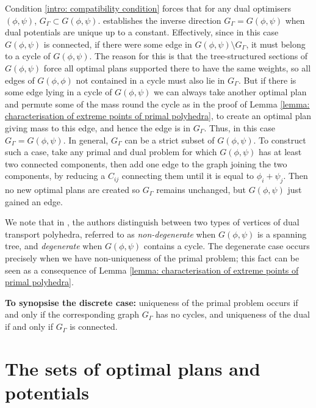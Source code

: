 \documentclass[11pt, oneside, titlepage]{book}
\theoremstyle{plain}
\theoremstyle{definition}
\begin{document}
Condition \eqref{intro: compatibility condition} forces that for any dual optimisers $(\phi, \psi)$, $G_\Gamma \subset G(\phi, \psi)$. \cite[Proposition 3.6]{acciaio2025characterization} establishes the inverse direction $G_\Gamma = G(\phi, \psi)$ when dual potentials are unique up to a constant. Effectively, since in this case $G(\phi, \psi)$ is connected, if there were some edge in $G(\phi, \psi) \setminus G_\Gamma$, it must belong to a cycle of $G(\phi, \psi)$. The reason for this is that the tree-structured sections of $G(\phi, \psi)$ force all optimal plans supported there to have the same weights, so all edges of $G(\phi, \phi)$ not contained in a cycle must also lie in $G_\Gamma$. But if there is some edge lying in a cycle of $G(\phi, \psi)$ we can always take another optimal plan and permute some of the mass round the cycle as in the proof of Lemma \ref{lemma: characterisation of extreme points of primal polyhedra}, to create an optimal plan giving mass to this edge, and hence the edge is in $G_\Gamma$. Thus, in this case $G_\Gamma = G(\phi, \psi)$. In general, $G_\Gamma$ can be a strict subset of $G(\phi, \psi)$. To construct such a case, take any primal and dual problem for which $G(\phi, \psi)$ has at least two connected components, then add one edge to the graph joining the two components, by reducing a $C_{ij}$ connecting them until it is equal to $\phi_i + \psi_j$. Then no new optimal plans are created so $G_\Gamma$ remains unchanged, but $G(\phi, \psi)$ just gained an edge.

We note that in \cite{balinski1984faces}, the authors distinguish between two types of vertices of dual transport polyhedra, referred to as \textit{non-degenerate} when $G(\phi, \psi)$ is a spanning tree, and \textit{degenerate} when $G(\phi, \psi)$ contains a cycle. The degenerate case occurs precisely when we have non-uniqueness of the primal problem; this fact can be seen as a consequence of Lemma \ref{lemma: characterisation of extreme points of primal polyhedra}. 

\textbf{To synopsise the discrete case:} uniqueness of the primal problem occurs if and only if the corresponding graph $G_\Gamma$ has no cycles, and uniqueness of the dual if and only if $G_\Gamma$ is connected.







\section{The sets of optimal plans and potentials}
\end{document}
